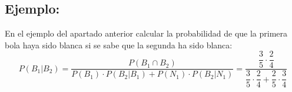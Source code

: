 \subsection{Ejemplo:} En el ejemplo del apartado anterior calcular la probabilidad de que la primera bola haya sido blanca si se sabe que la segunda ha sido blanca:
$$P(B_1|B_2)=\dfrac{P(B_1 \cap B_2)}{P(B_1)\cdot  P(B_2|B_1)+P(N_1)\cdot  P(B_2|N_1)}=\dfrac{\dfrac{3}{5}\cdot\dfrac{2}{4}}{\dfrac{3}{5}\cdot\dfrac{2}{4} + \dfrac{2}{5}\cdot\dfrac{3}{4}}$$